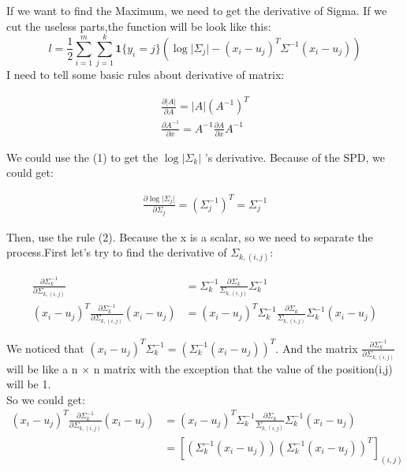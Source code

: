 \documentclass[a4paper]{article}
\begin{document}
If we want to find the Maximum, we need to get the derivative of Sigma. If we cut the useless parts,the function will be look like this:
$$
l = \frac 1 2\sum_{i=1}^m  \sum_{j=1}^k \mathbf{1}\{y_i=j\}(\log\vert \Sigma_j\vert - (x_i-u_j)^T\Sigma^{-1}(x_i-u_j))
$$
I need to tell some basic rules about derivative of matrix:


\begin{align}
\frac { \partial \vert A\vert}{\partial A} = |A|(A^{-1})^T\\
\frac {\partial A^{-1}}{\partial x} = A^{-1}\frac{\partial A}{\partial x} A^{-1}     
\end{align}

We could use the (1) to get the $\log |\Sigma_k|$ 's derivative. Because of the SPD, we could get:

\begin{align}
\frac {\partial \log \vert \Sigma_j \vert}{\partial \Sigma_j} = (\Sigma_j^{-1})^T = \Sigma_j^{-1}
\end{align}

Then, use the rule (2). Because the x is a scalar, so we need to separate the process.First let's try to find the derivative of $\Sigma_{k,(i,j)}$:

\begin{equation*}
\begin{aligned}
\frac{\partial \Sigma_k^{-1}}{\partial \Sigma_{k,(i,j)}} &= \Sigma_k^{-1} \frac{\partial \Sigma_k}{ \Sigma_{k,(i,j)}}\Sigma_k^{-1}\\
(x_i-u_j)^T\frac{\partial \Sigma_k^{-1}}{\partial \Sigma_{k,(i,j)}}(x_i-u_j)&=  (x_i-u_j)^T\Sigma_k^{-1} \frac{\partial \Sigma_k}{ \Sigma_{k,(i,j)}}\Sigma_k^{-1}(x_i-u_j)
\end{aligned}
\end{equation*}

We noticed that $(x_i-u_j)^T\Sigma_k^{-1} = (\Sigma_k^{-1}(x_i-u_j))^T $.
And the matrix $\frac{\partial \Sigma_k^{-1}}{\partial \Sigma_{k,(i,j)}}$ will be like a n $\times$ n matrix with the exception that the value of the position(i,j) will be 1.
$$$$
So we could get:
\begin{equation*}
\begin{aligned}
(x_i-u_j)^T\frac{\partial \Sigma_k^{-1}}{\partial \Sigma_{k,(i,j)}}(x_i-u_j)&=  (x_i-u_j)^T\Sigma_k^{-1} \frac{\partial \Sigma_k}{ \Sigma_{k,(i,j)}}\Sigma_k^{-1}(x_i-u_j)\\
&= [(\Sigma_k^{-1}(x_i-u_j)) (\Sigma_k^{-1}(x_i-u_j))^T]_{(i,j)}
\end{aligned}
\end{equation*}
\end{document}
